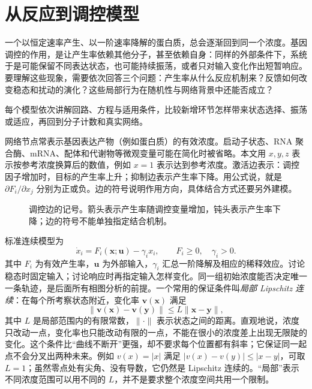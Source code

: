 \chapter{从反应到调控模型}
一个以恒定速率产生、以一阶速率降解的蛋白质，总会逐渐回到同一个浓度。基因调控的作用，是让产生率依赖其他分子，甚至依赖自身：同样的外部条件下，系统于是可能保留不同表达状态，也可能持续振荡，或者只对输入变化作出短暂响应。要理解这些现象，需要依次回答三个问题：产生率从什么反应机制来？反馈如何改变稳态和扰动的演化？这些局部行为在随机性与网络背景中还能否成立？

每个模型依次讲解回路、方程与适用条件，比较新增环节怎样带来状态选择、振荡或适应，再回到分子计数和真实网络。

网络节点常表示基因表达产物（例如蛋白质）的有效浓度。启动子状态、RNA 聚合酶、mRNA、配体和代谢物等微观变量可能在简化时被省略。本文用 $x,y,z$ 表示按参考浓度换算后的数值，例如 $x=1$ 表示达到参考浓度。激活边表示：调控因子增加时，目标的产生率上升；抑制边表示产生率下降。用公式说，就是 $\partial F_i/\partial x_j$ 分别为正或负。边的符号说明作用方向，具体结合方式还要另外建模。

\begin{figure}[H]\centering
{}
\caption{调控边的记号。箭头表示产生率随调控变量增加，钝头表示产生率下降；边的符号不能单独指定结合机制。}\label{fig:signs}
\end{figure}

标准连续模型为
\begin{equation}\dot x_i=F_i(\bm{x};\bm{u})-\gamma_i x_i,\qquad F_i\geq0,\quad\gamma_i>0.\end{equation}
其中 $F_i$ 为有效产生率，$\bm u$ 为外部输入，$\gamma_i$ 汇总一阶降解及相应的稀释效应。讨论稳态时固定输入；讨论响应时再指定输入怎样变化。同一组初始浓度能否决定唯一一条轨迹，是后面所有相图分析的前提。一个常用的保证条件叫\emph{局部 Lipschitz 连续}：在每个所考察状态附近，变化率 $\bm v(\bm x)$ 满足
\[
\|\bm v(\bm x)-\bm v(\bm y)\|\leq L\|\bm x-\bm y\|,
\]
其中 $L$ 是局部范围内的有限常数，$\|\cdot\|$ 表示状态之间的距离。直观地说，浓度只改动一点，变化率也只能改动有限的一点，不能在很小的浓度差上出现无限陡的变化。这个条件比“曲线不断开”更强，却不要求每个位置都有斜率；它保证同一起点不会分叉出两种未来。例如 $v(x)=|x|$ 满足 $|v(x)-v(y)|\leq|x-y|$，可取 $L=1$；虽然零点处有尖角、没有导数，它仍然是 Lipschitz 连续的。“局部”表示不同浓度范围可以用不同的 $L$，并不是要求整个浓度空间共用一个限制。

